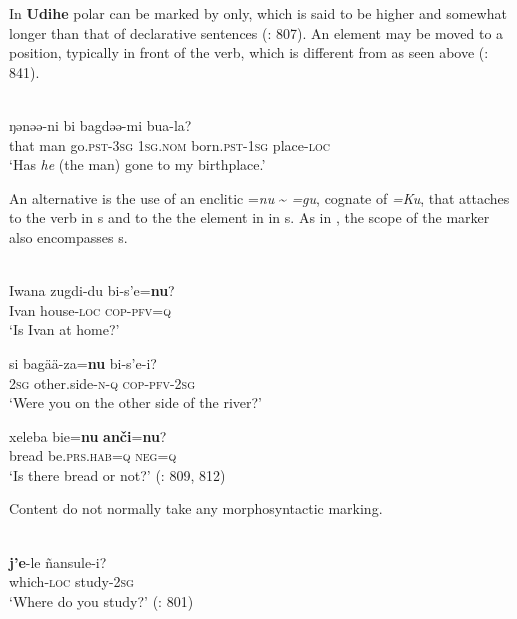 In \textbf{Udihe} polar  can be marked by  only, which is said to be higher and somewhat longer than that of declarative sentences (\citealt{NikolaevaTolskaya2001}: 807). An element may be moved to a  position, typically in front of the verb, which is different from  as seen above (\citealt{NikolaevaTolskaya2001}: 841).

\newpage 
\ea%
    \label{ex:tungu:35}
   \\
    \gll {}    ŋənəə-ni  bi  bagdəə-mi  bua-la?\\
    that  man  go.\textsc{pst}-3\textsc{sg}  1\textsc{sg}.\textsc{nom}  born.\textsc{pst}-1\textsc{sg}  place-\textsc{loc}\\
    \glt ‘Has \textit{he} (the man) gone to my birthplace.’ \citep[41]{Girfanova2002}
    \z

An alternative is the use of an enclitic =\textit{nu} {\textasciitilde} \textit{=gu}, cognate of  \textit{=Ku}, that attaches to the verb in s and to the the element in  in s. As in , the scope of the marker also encompasses s.

\ea%
    \label{ex:tungu:36}
    \\
    \ea
    \gll Iwana  zugdi-du  bi-s’e=\textbf{{nu}}?\\
    Ivan  house-\textsc{loc}  \textsc{cop}-\textsc{pfv}=\textsc{q}\\
    \glt ‘Is Ivan at home?’
    
    \ex
    \gll si  bagä{ä-za=}\textbf{{nu}} bi-s’e-i?\\
    2\textsc{sg}  other.side-\textsc{n}-\textsc{q}  \textsc{cop}-\textsc{pfv}-2\textsc{sg}\\
    \glt ‘Were you on the other side of the river?’
    
    \ex
    \gll xeleba    bie=\textbf{{nu}} \textbf{{anči}}{=}\textbf{{nu}}?\\
    bread    be.\textsc{prs}.\textsc{hab}=\textsc{q}  \textsc{neg}=\textsc{q}\\
    \glt ‘Is there bread or not?’ (\citealt{NikolaevaTolskaya2001}: 809, 812)\z\z

Content  do not normally take any morphosyntactic marking.

\ea%
    \label{ex:tungu:37}
    \\
    \gll \textbf{{j’e}}-le    ñansule-i?\\
    which-\textsc{loc}  study-2\textsc{sg}\\
    \glt ‘Where do you study?’ (\citealt{NikolaevaTolskaya2001}: 801)
    \z

